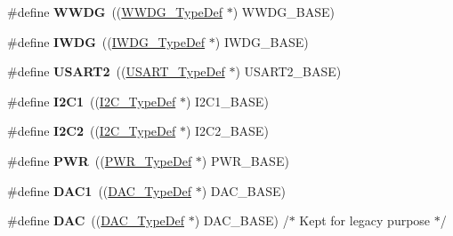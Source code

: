 \begin{DoxyCompactItemize}
\#define {\bfseries W\+W\+DG}~((\hyperlink{struct_w_w_d_g___type_def}{W\+W\+D\+G\+\_\+\+Type\+Def} $\ast$) W\+W\+D\+G\+\_\+\+B\+A\+SE)
\item 
\mbox{\label{group___peripheral__declaration_gad16b79dd94ee85d261d08a8ee94187e7}} 
\#define {\bfseries I\+W\+DG}~((\hyperlink{struct_i_w_d_g___type_def}{I\+W\+D\+G\+\_\+\+Type\+Def} $\ast$) I\+W\+D\+G\+\_\+\+B\+A\+SE)
\item 
\mbox{\label{group___peripheral__declaration_gaf114a9eab03ca08a6fb720e511595930}} 
\#define {\bfseries U\+S\+A\+R\+T2}~((\hyperlink{struct_u_s_a_r_t___type_def}{U\+S\+A\+R\+T\+\_\+\+Type\+Def} $\ast$) U\+S\+A\+R\+T2\+\_\+\+B\+A\+SE)
\item 
\mbox{\label{group___peripheral__declaration_gab45d257574da6fe1f091cc45b7eda6cc}} 
\#define {\bfseries I2\+C1}~((\hyperlink{struct_i2_c___type_def}{I2\+C\+\_\+\+Type\+Def} $\ast$) I2\+C1\+\_\+\+B\+A\+SE)
\item 
\mbox{\label{group___peripheral__declaration_gafa60ac20c1921ef1002083bb3e1f5d16}} 
\#define {\bfseries I2\+C2}~((\hyperlink{struct_i2_c___type_def}{I2\+C\+\_\+\+Type\+Def} $\ast$) I2\+C2\+\_\+\+B\+A\+SE)
\item 
\mbox{\label{group___peripheral__declaration_ga04651c526497822a859942b928e57f8e}} 
\#define {\bfseries P\+WR}~((\hyperlink{struct_p_w_r___type_def}{P\+W\+R\+\_\+\+Type\+Def} $\ast$) P\+W\+R\+\_\+\+B\+A\+SE)
\item 
\mbox{\label{group___peripheral__declaration_gaffb5ff8779fa698f3c7165a617d56e4f}} 
\#define {\bfseries D\+A\+C1}~((\hyperlink{struct_d_a_c___type_def}{D\+A\+C\+\_\+\+Type\+Def} $\ast$) D\+A\+C\+\_\+\+B\+A\+SE)
\item 
\mbox{\label{group___peripheral__declaration_ga4aa2a4ab86ce00c23035e5cee2e7fc7e}} 
\#define {\bfseries D\+AC}~((\hyperlink{struct_d_a_c___type_def}{D\+A\+C\+\_\+\+Type\+Def} $\ast$) D\+A\+C\+\_\+\+B\+A\+SE) /$\ast$ Kept for legacy purpose $\ast$/
\item 
\mbox{\label{group___peripheral__declaration_ga7d03f4d873d59ff8bc76b6c9b576f3e3}} 

\end{DoxyCompactItemize}
